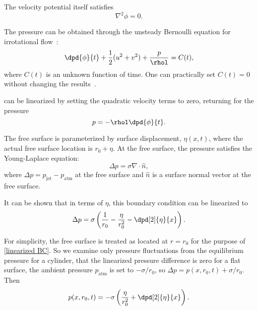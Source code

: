 \documentclass[ccbysa,note]{bmtreport}
\begin{document}
The velocity potential itself satisfies~\citep[p.~284]{panton_incompressible_2013}
\begin{equation}
   \nabla^2 \phi = 0. \label{eq:Laplace equation}
\end{equation}

The pressure can be obtained through the unsteady Bernoulli equation for irrotational flow~\citep[p.~284]{panton_incompressible_2013}:
\begin{equation}
   \dpd{\phi}{t} + \frac{1}{2} (u^2 + v^2) + \frac{p}{\rhol} = C(t), \label{eq:unsteady Bernoulli}
\end{equation}
where $C(t)$ is an unknown function of time. One can practically set $C(t) = 0$ without changing the results~\citep[p.~503]{panton_incompressible_2013}.

 can be linearized by setting the quadratic velocity terms to zero, returning for the pressure
\begin{equation}
   p = -\rhol \dpd{\phi}{t}. \label{eq:unsteady Bernoulli linearized}
\end{equation}

The free surface is parameterized by surface displacement, $\eta(x, t)$, where the actual free surface location is $r_0 + \eta$. At the free surface, the pressure satisfies the Young-Laplace equation:
\begin{equation}
   \Delta p = \sigma \nabla \cdot \hat{n}, \label{eq:exact BC}
\end{equation}
where $\Delta p = p_\text{jet} - p_\text{atm}$ at the free surface and $\hat{n}$ is a surface normal vector at the free surface.

It can be shown that in terms of $\eta$, this boundary condition can be linearized to~\citep[p.~975]{berger_initial-value_1988}
\begin{equation}
   \Delta p = \sigma \left(\frac{1}{r_0} - \frac{\eta}{r_0^2} - \dpd[2]{\eta}{x}\right). \label{eq:linearized BC}
\end{equation}

For simplicity, the free surface is treated as located at $r = r_0$ for the purpose of \eqref{linearized BC}. So we examine only pressure fluctuations from the equilibrium pressure for a cylinder, that the linearized pressure difference is zero for a flat surface, the ambient pressure $p_\text{atm}$ is set to $-\sigma/r_0$, so $\Delta p = p(x, r_0, t) + \sigma/r_0$. Then
\begin{equation}
   p(x, r_0, t) = -\sigma \left(\frac{\eta}{r_0^2} + \dpd[2]{\eta}{x}\right). \label{eq:linearized BC simplified}
\end{equation}
\end{document}
